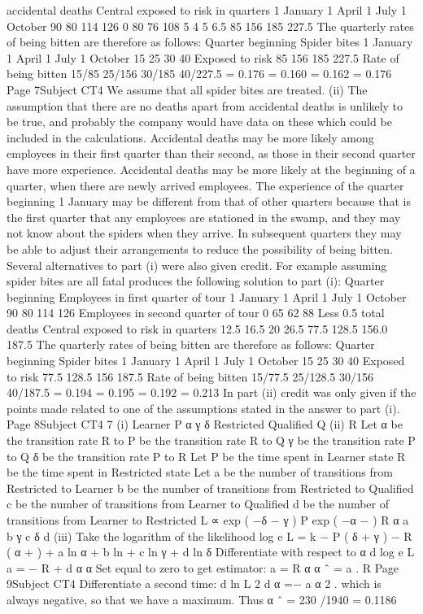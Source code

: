 accidental
deaths Central
exposed
to risk in
quarters
1 January
1 April
1 July
1 October 90
80
114
126 0
80
76
108 5
4
5
6.5 85
156
185
227.5
The quarterly rates of being bitten are therefore as follows:
Quarter
beginning Spider bites
1 January
1 April
1 July
1 October 15
25
30
40
Exposed to
risk
85
156
185
227.5
Rate of
being bitten
15/85
25/156
30/185
40/227.5
= 0.176
= 0.160
= 0.162
= 0.176
Page 7Subject CT4 %
We assume that all spider bites are treated.
(ii)
The assumption that there are no deaths apart from accidental deaths is
unlikely to be true, and probably the company would have data on these
which could be included in the calculations.
Accidental deaths may be more likely among employees in their first quarter
than their second, as those in their second quarter have more experience.
Accidental deaths may be more likely at the beginning of a quarter, when
there are newly arrived employees.
The experience of the quarter beginning 1 January may be different from that
of other quarters because that is the first quarter that any employees are
stationed in the swamp, and they may not know about the spiders when they
arrive. In subsequent quarters they may be able to adjust their
arrangements to reduce the possibility of being bitten.
Several alternatives to part (i) were also given credit. For example assuming spider bites are
all fatal produces the following solution to part (i):
Quarter
beginning Employees in
first quarter
of tour
1 January
1 April
1 July
1 October 90
80
114
126
Employees in
second quarter
of tour
0
65
62
88
Less 0.5 \times
total
deaths Central
exposed
to risk in
quarters
12.5
16.5
20
26.5 77.5
128.5
156.0
187.5
The quarterly rates of being bitten are therefore as follows:
Quarter
beginning Spider bites
1 January
1 April
1 July
1 October 15
25
30
40
Exposed to
risk
77.5
128.5
156
187.5
Rate of
being bitten
15/77.5
25/128.5
30/156
40/187.5
= 0.194
= 0.195
= 0.192
= 0.213
In part (ii) credit was only given if the points made related to one of the assumptions stated in
the answer to part (i).
Page 8Subject CT4 %
7
(i)
Learner
P
α
γ
δ
Restricted
Qualified
Q
(ii)
R
\beta
Let α be the transition rate R to P
\beta be the transition rate R to Q
γ be the transition rate P to Q
δ be the transition rate P to R
Let P be the time spent in Learner state
R be the time spent in Restricted state
Let a be the number of transitions from Restricted to Learner
b be the number of transitions from Restricted to Qualified
c be the number of transitions from Learner to Qualified
d be the number of transitions from Learner to Restricted
L ∝ exp { ( −δ − γ ) P } exp { ( −α − \beta ) R } α a \beta b γ c δ d
(iii)
Take the logarithm of the likelihood
log e L = k − P ( δ + γ ) − R ( α + \beta ) + a ln α + b ln \beta + c ln γ + d ln δ
Differentiate with respect to α
d log e L
a
= − R +
d α
α
Set equal to zero to get estimator:
a
= R
α
α ˆ = a .
R
Page 9Subject CT4 %
Differentiate a second time:
d ln L
2
d α
=−
a
α 2
.
which is always negative, so that we have a maximum.
Thus α ˆ = 230 /1940 = 0.1186
